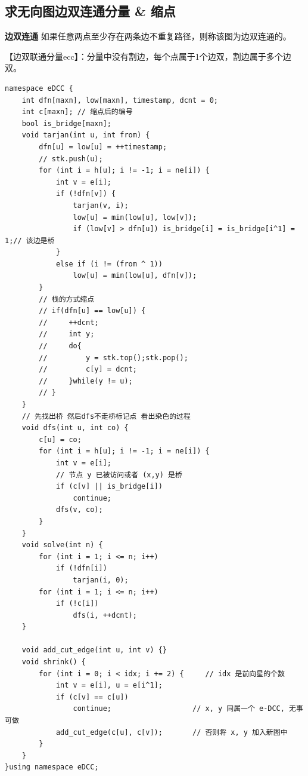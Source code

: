 \subsection{求无向图边双连通分量 \& 缩点}
\par \noindent \textbf{边双连通} 如果任意两点至少存在两条边不重复路径，则称该图为边双连通的。
~\\
\par \noindent 【边双联通分量ecc】：分量中没有割边，每个点属于1个边双，割边属于多个边双。

\begin{verbatim}
namespace eDCC {
    int dfn[maxn], low[maxn], timestamp, dcnt = 0;
    int c[maxn]; // 缩点后的编号
    bool is_bridge[maxn];
    void tarjan(int u, int from) {
        dfn[u] = low[u] = ++timestamp;
        // stk.push(u);
        for (int i = h[u]; i != -1; i = ne[i]) {
            int v = e[i];
            if (!dfn[v]) {
                tarjan(v, i);
                low[u] = min(low[u], low[v]);
                if (low[v] > dfn[u]) is_bridge[i] = is_bridge[i^1] = 1;// 该边是桥
            }
            else if (i != (from ^ 1))
                low[u] = min(low[u], dfn[v]);
        }
        // 栈的方式缩点
        // if(dfn[u] == low[u]) {
        //     ++dcnt;
        //     int y;
        //     do{
        //         y = stk.top();stk.pop();
        //         c[y] = dcnt;
        //     }while(y != u);
        // }
    }
    // 先找出桥 然后dfs不走桥标记点 看出染色的过程
    void dfs(int u, int co) {
        c[u] = co;
        for (int i = h[u]; i != -1; i = ne[i]) {
            int v = e[i];
            // 节点 y 已被访问或者 (x,y) 是桥 
            if (c[v] || is_bridge[i])
                continue;
            dfs(v, co);
        }
    }
    void solve(int n) {
        for (int i = 1; i <= n; i++)
            if (!dfn[i])
                tarjan(i, 0);
        for (int i = 1; i <= n; i++)
            if (!c[i])
                dfs(i, ++dcnt);
    }

    void add_cut_edge(int u, int v) {}
    void shrink() {
        for (int i = 0; i < idx; i += 2) {     // idx 是前向星的个数
            int v = e[i], u = e[i^1];
            if (c[v] == c[u])
                continue;                   // x, y 同属一个 e-DCC, 无事可做
            add_cut_edge(c[u], c[v]);       // 否则将 x, y 加入新图中
        }
    }    
}using namespace eDCC;
\end{verbatim}